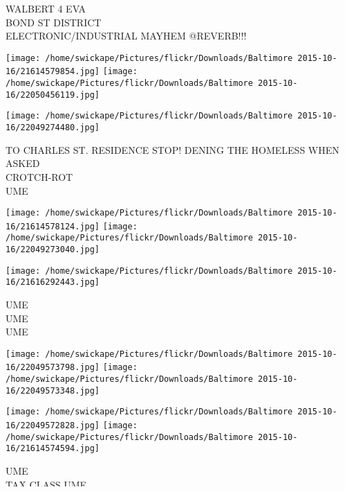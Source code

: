 \documentclass[10pt,letterpaper]{article}
\begin{document}
WALBERT 4 EVA\\
BOND ST DISTRICT\\
ELECTRONIC/INDUSTRIAL MAYHEM @REVERB!!!\\
\pagebreak

\texttt{[image: /home/swickape/Pictures/flickr/Downloads/Baltimore 2015-10-16/21614579854.jpg]}
\texttt{[image: /home/swickape/Pictures/flickr/Downloads/Baltimore 2015-10-16/22050456119.jpg]}

\vspace{0.25in}
\texttt{[image: /home/swickape/Pictures/flickr/Downloads/Baltimore 2015-10-16/22049274480.jpg]}

TO CHARLES ST. RESIDENCE STOP! DENING THE HOMELESS WHEN ASKED\\
CROTCH{-}ROT\\
UME\\
\pagebreak

\texttt{[image: /home/swickape/Pictures/flickr/Downloads/Baltimore 2015-10-16/21614578124.jpg]}
\texttt{[image: /home/swickape/Pictures/flickr/Downloads/Baltimore 2015-10-16/22049273040.jpg]}

\vspace{0.25in}
\texttt{[image: /home/swickape/Pictures/flickr/Downloads/Baltimore 2015-10-16/21616292443.jpg]}

UME\\
UME\\
UME\\
\pagebreak

\texttt{[image: /home/swickape/Pictures/flickr/Downloads/Baltimore 2015-10-16/22049573798.jpg]}
\texttt{[image: /home/swickape/Pictures/flickr/Downloads/Baltimore 2015-10-16/22049573348.jpg]}

\texttt{[image: /home/swickape/Pictures/flickr/Downloads/Baltimore 2015-10-16/22049572828.jpg]}
\texttt{[image: /home/swickape/Pictures/flickr/Downloads/Baltimore 2015-10-16/21614574594.jpg]}

UME\\
TAX CLASS UME\\
ERASE BAD CREDIT \$269\\
TAX CLASS\\
\pagebreak

\texttt{[image: /home/swickape/Pictures/flickr/Downloads/Baltimore 2015-10-16/22224523592.jpg]}
\texttt{[image: /home/swickape/Pictures/flickr/Downloads/Baltimore 2015-10-16/22247725441.jpg]}
\end{document}
